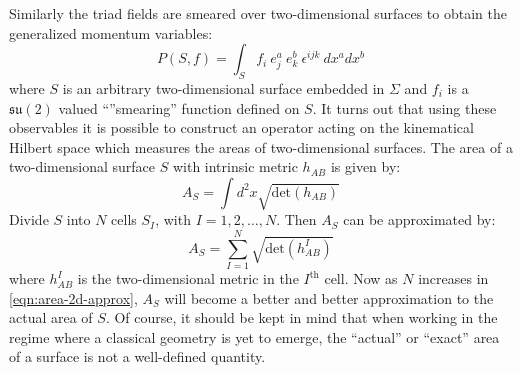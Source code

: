 \documentclass{ws-mpla}
\newcommand{\mf}[1]{\mathfrak{#1}}
\begin{document}
Similarly the triad fields are smeared over two-dimensional surfaces to obtain the generalized momentum variables:
\begin{equation}\label{eqn:triad}
P(S, f) = \int_S f_i~e^a_j~e^b_k~\epsilon^{ijk}~dx^a dx^b
\end{equation}
where $ S $ is an arbitrary two-dimensional surface embedded in $ \Sigma $ and $ f_i $ is a $ \mf{su}(2) $ valued ``''smearing'' function defined on $ S $. It turns out that using these observables it is possible to construct an operator acting on the kinematical Hilbert space which measures the areas of two-dimensional surfaces. The area of a two-dimensional surface $ S $ with intrinsic metric $ h_{AB} $ is given by:
\begin{equation}\label{eqn:area-2d}
	A_S = \int d^2 x \sqrt{\text{det}(h_{AB})}
\end{equation}
Divide $ S $ into $ N $ cells $ S_I $, with $ I = 1,2,\ldots,N $. Then $ A_S $ can be approximated by:
\begin{equation}\label{eqn:area-2d-approx}
	A_S = \sum_{I=1}^N \sqrt{\text{det}(h^I_{AB})}
\end{equation}
where $ h^I_{AB} $ is the two-dimensional metric in the $ I^\text{th} $ cell. Now as $ N $ increases in \eqref{eqn:area-2d-approx}, $ A_S $ will become a better and better approximation to the actual area of $ S $. Of course, it should be kept in mind that when working in the regime where a classical geometry is yet to emerge, the ``actual'' or ``exact'' area of a surface is not a well-defined quantity.
\end{document}

